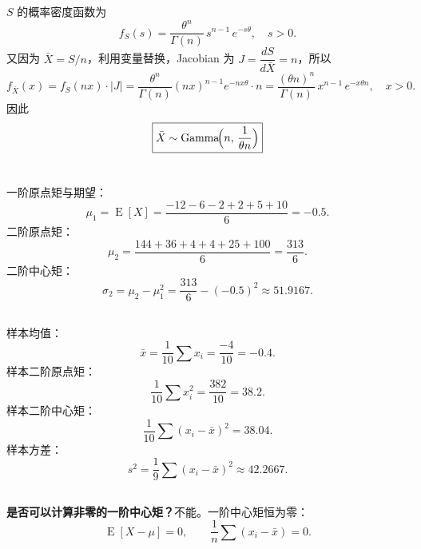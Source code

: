 \documentclass[12pt,a4paper]{article}
\newcommand{\E}{\operatorname{E}}
\newcommand{\Ga}{\operatorname{Gamma}}
\begin{document}
$S$ 的概率密度函数为
\[
  f_{S}(s)=\frac{\theta^{n}}{\Gamma(n)}\,s^{n-1}\,e^{-s\theta},\quad s>0.
\]
又因为 $\bar{X}=S/n$，利用变量替换，Jacobian 为 $J=\dfrac{dS}{d\bar{X}}=n$，所以
\[
  f_{\bar{X}}(x)
  =f_{S}(nx)\cdot|J|
  =\frac{\theta^{n}}{\Gamma(n)}(nx)^{n-1}e^{-nx\theta}\cdot n
  =\frac{(\theta n)^{n}}{\Gamma(n)}\,x^{n-1}\,e^{-x\theta n},\quad x>0.
\]
因此
\[
  \boxed{\bar{X}\sim\Ga\!\Bigl(n,\,\frac{1}{\theta n}\Bigr)}
\]

\section{}

\subsection{}

一阶原点矩与期望：
\[
  \mu_{1}=\E[X]=\frac{-12-6-2+2+5+10}{6}=-0.5.
\]
二阶原点矩：
\[
  \mu_{2}=\frac{144+36+4+4+25+100}{6}=\frac{313}{6}.
\]
二阶中心矩：
\[
  \sigma_{2}=\mu_{2}-\mu_{1}^{2}=\frac{313}{6}-(-0.5)^{2}\approx51.9167.
\]

\subsection{}

样本均值：
\[
  \bar{x}=\frac{1}{10}\sum x_{i}=\frac{-4}{10}=-0.4.
\]
样本二阶原点矩：
\[
  \frac{1}{10}\sum x_{i}^{2}=\frac{382}{10}=38.2.
\]
样本二阶中心矩：
\[
  \frac{1}{10}\sum(x_{i}-\bar{x})^{2}=38.04.
\]
样本方差：
\[
  s^{2}=\frac{1}{9}\sum(x_{i}-\bar{x})^{2}\approx42.2667.
\]

\subsection{}

\textbf{是否可以计算非零的一阶中心矩？}\;不能。一阶中心矩恒为零：
\[
  \E[X-\mu]=0,\qquad \frac{1}{n}\sum(x_{i}-\bar{x})=0.
\]

\section{}

\subsection{}
\end{document}

